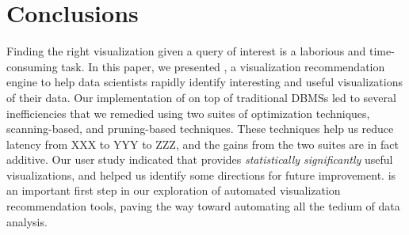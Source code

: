 
\section{Conclusions}
\label{sec:conc}

Finding the right visualization given a query of interest is a
laborious and time-consuming task.
In this paper, we presented \SeeDB, a visualization recommendation
engine to help data scientists 
rapidly identify interesting and useful visualizations of their data.
Our implementation of \SeeDB on top of traditional DBMSs led
to several inefficiencies that we remedied using two suites of optimization 
techniques, scanning-based, and pruning-based techniques. 
These techniques help us reduce latency from XXX to YYY to ZZZ,
and the gains from the two suites are in fact additive. 
Our user study indicated that \SeeDB provides {\em statistically significantly} useful
visualizations, and helped us identify some directions for future improvement.
\SeeDB is an important first step in our exploration of 
automated visualization recommendation tools, 
paving the way toward automating all the tedium of data analysis.



